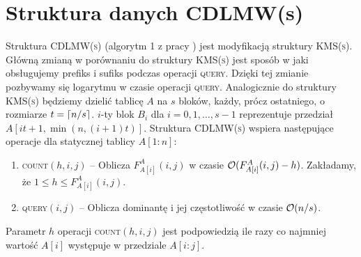 \section{Struktura danych CDLMW(s)}
\label{sec:cdlmw}
Struktura \textsc{CDLMW(s)} (algorytm 1 z pracy \cite{chan14}) jest modyfikacją struktury \textsc{KMS(s)}. Główną zmianą w porównaniu do struktury \textsc{KMS(s)} jest sposób w jaki obsługujemy prefiks i sufiks podczas operacji \textsc{query}. Dzięki tej zmianie pozbywamy się logarytmu w czasie operacji \textsc{query}. Analogicznie do struktury \textsc{KMS(s)} będziemy dzielić tablicę $A$ na $s$ bloków, każdy, prócz ostatniego, o rozmiarze $t=\left\lceil n/s\right\rceil$. $i$-ty blok $B_i$ dla $i=0,1,\dots,s-1$ reprezentuje przedział $A[it+1, \min(n,(i+1)t)]$.
Struktura  \textsc{CDLMW(s)} wspiera następujące operacje dla statycznej tablicy $A[1:n]$:
\begin{enumerate}[nosep]
    \item \textsc{count}$(h,i,j)$ -- Oblicza $F^A_{A[i]}(i, j)$ w czasie $\mathcal{O}(F^A_{A[i]}(i, j) - h)$. Zakładamy, że $1 \le h \le F^A_{A[i]}(i,j).$
    \item \textsc{query}$(i, j)$ -- Oblicza dominantę i jej częstotliwość w czasie $\mathcal{O}(n/s)$.
\end{enumerate}
Parametr $h$ operacji \textsc{count}$(h,i,j)$ jest podpowiedzią ile razy co najmniej wartość $A[i]$ występuje w przedziale $A[i:j]$.
